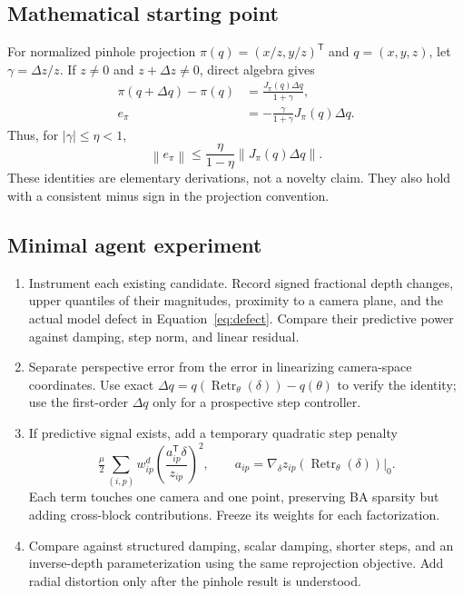 \documentclass[11pt,a4paper]{article}
\newcommand{\Retr}{\operatorname{Retr}}
\newcommand{\norm}[1]{\left\lVert #1\right\rVert}
\begin{document}
\subsection*{Mathematical starting point}
For normalized pinhole projection $\pi(q)=(x/z,y/z)^{\mathsf T}$ and $q=(x,y,z)$, let $\gamma=\Delta z/z$. If $z\ne0$ and $z+\Delta z\ne0$, direct algebra gives
\begin{align}
 \pi(q+\Delta q)-\pi(q)&=\frac{J_\pi(q)\Delta q}{1+\gamma},\\
 e_\pi&=-\frac{\gamma}{1+\gamma}J_\pi(q)\Delta q.
\end{align}
Thus, for $|\gamma|\le\eta<1$,
\begin{equation}
 \norm{e_\pi}\le\frac{\eta}{1-\eta}\norm{J_\pi(q)\Delta q}.
\end{equation}
These identities are elementary derivations, not a novelty claim. They also hold with a consistent minus sign in the projection convention.

\subsection*{Minimal agent experiment}
\begin{enumerate}
\item Instrument each existing candidate. Record signed fractional depth changes, upper quantiles of their magnitudes, proximity to a camera plane, and the actual model defect in Equation~\eqref{eq:defect}. Compare their predictive power against damping, step norm, and linear residual.
\item Separate perspective error from the error in linearizing camera-space coordinates. Use exact $\Delta q=q(\Retr_\theta(\delta))-q(\theta)$ to verify the identity; use the first-order $\Delta q$ only for a prospective step controller.
\item If predictive signal exists, add a temporary quadratic step penalty
\begin{equation}
 \tfrac{\mu}{2}\sum_{(i,p)} w^{d}_{ip}
 \left(\frac{a_{ip}^{\mathsf T}\delta}{z_{ip}}\right)^2,
 \qquad a_{ip}=\nabla_\delta z_{ip}(\Retr_\theta(\delta))\big|_0.
\end{equation}
Each term touches one camera and one point, preserving BA sparsity but adding cross-block contributions. Freeze its weights for each factorization.
\item Compare against structured damping, scalar damping, shorter steps, and an inverse-depth parameterization using the same reprojection objective. Add radial distortion only after the pinhole result is understood.
\end{enumerate}
\end{document}
